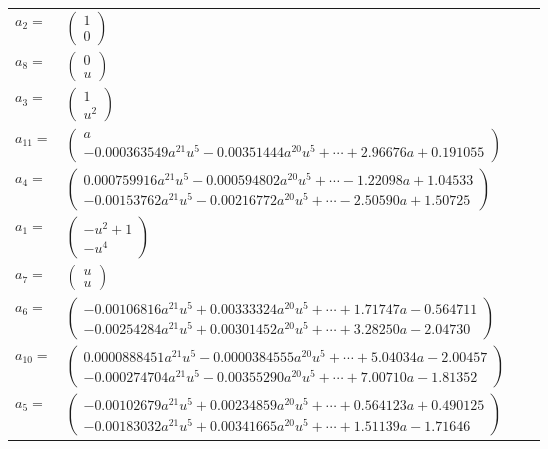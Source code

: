 \documentclass[1p]{elsarticle_modified}
\theoremstyle{definition}
\begin{document}
\begin{tabular}{m{7pt} m{180pt} m{7pt} m{180pt} }
\flushright $a_{2}=$&$\begin{pmatrix}1\\0\end{pmatrix}$ \\
\flushright $a_{8}=$&$\begin{pmatrix}0\\u\end{pmatrix}$ \\
\flushright $a_{3}=$&$\begin{pmatrix}1\\u^2\end{pmatrix}$ \\
\flushright $a_{11}=$&$\begin{pmatrix}a\\-0.000363549 a^{21} u^{5}-0.00351444 a^{20} u^{5}+\cdots+2.96676 a+0.191055\end{pmatrix}$ \\
\flushright $a_{4}=$&$\begin{pmatrix}0.000759916 a^{21} u^{5}-0.000594802 a^{20} u^{5}+\cdots-1.22098 a+1.04533\\-0.00153762 a^{21} u^{5}-0.00216772 a^{20} u^{5}+\cdots-2.50590 a+1.50725\end{pmatrix}$ \\
\flushright $a_{1}=$&$\begin{pmatrix}- u^2+1\\- u^4\end{pmatrix}$ \\
\flushright $a_{7}=$&$\begin{pmatrix}u\\u\end{pmatrix}$ \\
\flushright $a_{6}=$&$\begin{pmatrix}-0.00106816 a^{21} u^{5}+0.00333324 a^{20} u^{5}+\cdots+1.71747 a-0.564711\\-0.00254284 a^{21} u^{5}+0.00301452 a^{20} u^{5}+\cdots+3.28250 a-2.04730\end{pmatrix}$ \\
\flushright $a_{10}=$&$\begin{pmatrix}0.0000888451 a^{21} u^{5}-0.0000384555 a^{20} u^{5}+\cdots+5.04034 a-2.00457\\-0.000274704 a^{21} u^{5}-0.00355290 a^{20} u^{5}+\cdots+7.00710 a-1.81352\end{pmatrix}$ \\
\flushright $a_{5}=$&$\begin{pmatrix}-0.00102679 a^{21} u^{5}+0.00234859 a^{20} u^{5}+\cdots+0.564123 a+0.490125\\-0.00183032 a^{21} u^{5}+0.00341665 a^{20} u^{5}+\cdots+1.51139 a-1.71646\end{pmatrix}$ \\

\end{tabular}
\end{document}
